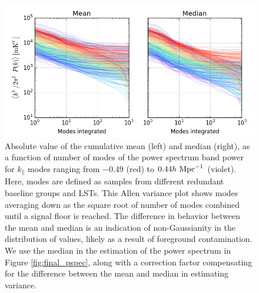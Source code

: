 \documentclass[twocolumn,numberedappendix]{emulateapj} \shorttitle{New Limits on the 21 cm Power Spectrum at $z=8.4$}
\newcommand{\hMpci}{h\ {\rm Mpc}^{-1}}
\begin{document}
\begin{figure}\centering
\includegraphics[width=1.8\columnwidth]{plots/pspec_variance.png}
\caption{
Absolute value of the cumulative mean (left) and median (right), as a function of number of modes 
of the power spectrum band power for
$k_\parallel$ modes ranging from $-0.49$ (red) to $0.44\hMpci$ (violet).
Here, modes are defined as samples from different redundant baseline groups and LSTs.
This Allen variance plot shows modes averaging down as the square root of
number of modes combined until a signal floor is reached.  The difference in
behavior between the mean and median is an indication of non-Gaussianity
in the distribution of values, likely as a result of foreground contamination.
We use the median in the estimation of the power spectrum in Figure \ref{fig:final_pspec},
along with a correction factor compensating for the difference between the mean and median
in estimating variance.
}\label{fig:pspec_variance}
\end{figure}
\end{document}
